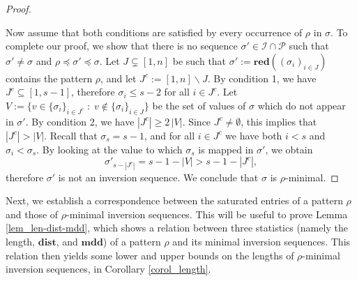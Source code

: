 \documentclass[a4paper,11pt]{article}
\theoremstyle{definition}
\theoremstyle{remark}
\newcommand{\I}{\mathcal{I}}
\renewcommand{\P}{\mathcal{P}}
\newcommand{\mdd}{\mathbf{mdd}}
\newcommand{\dist}{\mathbf{dist}}
\newcommand{\red}{\mathbf{red}}
\begin{document}
\begin{proof}
\begin{enumerate}
    \end{enumerate}
    Now assume that both conditions are satisfied by every occurrence of $\rho$ in $\sigma$. To complete our proof, we show that there is no sequence $\sigma' \in \I \cap \P$ such that $\sigma' \neq \sigma$ and ${\rho \preceq \sigma' \preceq \sigma}$.
    Let $J \varsubsetneq [1,n]$ be such that $\sigma' := \red((\sigma_i)_{i \in J})$ contains the pattern $\rho$, and let ${J^c := [1,n] \backslash J}$. By condition 1, we have $J^c \subseteq [1,s-1]$, therefore $\sigma_i \leq s-2$ for all $i \in J^c$. Let $V := \{v \in \{\sigma_i\}_{i \in J^c} \; : \; v \notin \{\sigma_i\}_{i \in J} \}$ be the set of values of $\sigma$ which do not appear in $\sigma'$. By condition 2, we have $|J^c| \geq 2 \,|V|$. Since $J^c \neq \emptyset$, this implies that $|J^c| > |V|$.
    Recall that $\sigma_s = s-1$, and for all $i \in J^c$ we have both $i < s$ and $\sigma_i < \sigma_s$. By looking at the value to which $\sigma_s$ is mapped in $\sigma'$, we obtain
    $$\sigma'_{s-|J^c|} = s-1 - |V| > s-1-|J^c|,$$
    therefore $\sigma'$ is not an inversion sequence. We conclude that $\sigma$ is $\rho$-minimal.
\end{proof}

Next, we establish a correspondence between the saturated entries of a pattern $\rho$ and those of $\rho$-minimal inversion sequences. This will be useful to prove Lemma \ref{lem_len-dist-mdd}, which shows a relation between three statistics (namely the length, $\dist$, and $\mdd$) of a pattern $\rho$ and its minimal inversion sequences. This relation then yields some lower and upper bounds on the lengths of $\rho$-minimal inversion sequences, in Corollary \ref{corol_length}.
\end{document}
